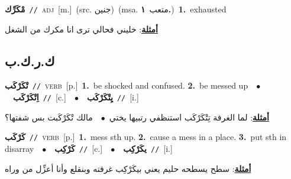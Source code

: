 \documentclass[10pt,a4paper,twoside]{article} %
\begin{document}
\begin{multicols}{2}
{\setlength\topsep{0pt}\textbf{\foreignlanguage{arabic}{مْكَرِّك}}\ {\color{gray}\texttt{//}\color{black}}\ \textsc{adj}\ [m.]\ (src. \color{gray}\foreignlanguage{arabic}{جنين}\color{black})\ \color{gray}(msa. \foreignlanguage{arabic}{متعب}~\foreignlanguage{arabic}{\textbf{١.}})\color{black}\ \textbf{1.}~exhausted\  \begin{flushright}\color{gray}\foreignlanguage{arabic}{\textbf{\underline{\foreignlanguage{arabic}{أمثلة}}}: خليني فحالي ترى انا مكرك من الشغل}\end{flushright}\color{black}} \vspace{2mm}

\vspace{-3mm}
\subsection*{\color{blue}\foreignlanguage{arabic}{ك.ر.ك.ب}\color{blue}{}} 

{\setlength\topsep{0pt}\textbf{\foreignlanguage{arabic}{تْكَرْكَب}}\ {\color{gray}\texttt{//}\color{black}}\ \textsc{verb}\ [p.]\ \textbf{1.}~be shocked and confused.  \textbf{2.}~be messed up\ \ $\bullet$\ \ \setlength\topsep{0pt}\textbf{\foreignlanguage{arabic}{اِتْكَرْكَب}}\ {\color{gray}\texttt{//}\color{black}}\ [c.]\ \ $\bullet$\ \ \setlength\topsep{0pt}\textbf{\foreignlanguage{arabic}{يِتْكَرْكَب}}\ {\color{gray}\texttt{//}\color{black}}\ [i.]\  \begin{flushright}\color{gray}\foreignlanguage{arabic}{\textbf{\underline{\foreignlanguage{arabic}{أمثلة}}}: لما الغرفة تِتْكَرْكَب استنظفي رتبيها يختي\ $\bullet$\ \  مالك تْكَرْكَبت بس شفتها؟}\end{flushright}\color{black}} \vspace{2mm}

{\setlength\topsep{0pt}\textbf{\foreignlanguage{arabic}{كَرْكَب}}\ {\color{gray}\texttt{//}\color{black}}\ \textsc{verb}\ [p.]\ \textbf{1.}~mess sth up.  \textbf{2.}~cause a mess in a place.  \textbf{3.}~put sth in disarray\ \ $\bullet$\ \ \setlength\topsep{0pt}\textbf{\foreignlanguage{arabic}{كَرْكِب}}\ {\color{gray}\texttt{//}\color{black}}\ [c.]\ \ $\bullet$\ \ \setlength\topsep{0pt}\textbf{\foreignlanguage{arabic}{يكَرْكِب}}\ {\color{gray}\texttt{//}\color{black}}\ [i.]\  \begin{flushright}\color{gray}\foreignlanguage{arabic}{\textbf{\underline{\foreignlanguage{arabic}{أمثلة}}}: سطح يسطحه حليم يعني بيكَرْكِب غرفته وبنقلع وأنا أعزِّل من وراه}\end{flushright}\color{black}} \vspace{2mm}


\end{multicols}
\end{document}

